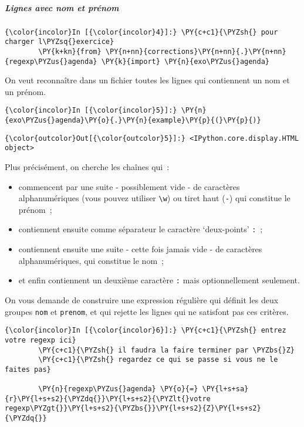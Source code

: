     \hypertarget{lignes-avec-nom-et-pruxe9nom}{%
\subparagraph{Lignes avec nom et
prénom}\label{lignes-avec-nom-et-pruxe9nom}}

    \begin{Verbatim}[commandchars=\\\{\}]
{\color{incolor}In [{\color{incolor}4}]:} \PY{c+c1}{\PYZsh{} pour charger l\PYZsq{}exercice}
        \PY{k+kn}{from} \PY{n+nn}{corrections}\PY{n+nn}{.}\PY{n+nn}{regexp\PYZus{}agenda} \PY{k}{import} \PY{n}{exo\PYZus{}agenda}
\end{Verbatim}


    On veut reconnaître dans un fichier toutes les lignes qui contiennent un
nom et un prénom.

    \begin{Verbatim}[commandchars=\\\{\}]
{\color{incolor}In [{\color{incolor}5}]:} \PY{n}{exo\PYZus{}agenda}\PY{o}{.}\PY{n}{example}\PY{p}{(}\PY{p}{)}
\end{Verbatim}


\begin{Verbatim}[commandchars=\\\{\}]
{\color{outcolor}Out[{\color{outcolor}5}]:} <IPython.core.display.HTML object>
\end{Verbatim}
            
    Plus précisément, on cherche les chaînes qui~:

\begin{itemize}
\tightlist
\item
  commencent par une suite - possiblement vide - de caractères
  alphanumériques (vous pouvez utiliser \texttt{\textbackslash{}w}) ou
  tiret haut (\texttt{-}) qui constitue le prénom~;
\item
  contiennent ensuite comme séparateur le caractère `deux-points'
  \texttt{:}~;
\item
  contiennent ensuite une suite - cette fois jamais vide - de caractères
  alphanumériques, qui constitue le nom~;
\item
  et enfin contiennent un deuxième caractère \texttt{:} mais
  optionnellement seulement.
\end{itemize}

    On vous demande de construire une expression régulière qui définit les
deux groupes \texttt{nom} et \texttt{prenom}, et qui rejette les lignes
qui ne satisfont pas ces critères.

    \begin{Verbatim}[commandchars=\\\{\}]
{\color{incolor}In [{\color{incolor}6}]:} \PY{c+c1}{\PYZsh{} entrez votre regexp ici}
        \PY{c+c1}{\PYZsh{} il faudra la faire terminer par \PYZbs{}Z}
        \PY{c+c1}{\PYZsh{} regardez ce qui se passe si vous ne le faites pas}
        
        \PY{n}{regexp\PYZus{}agenda} \PY{o}{=} \PY{l+s+sa}{r}\PY{l+s+s2}{\PYZdq{}}\PY{l+s+s2}{\PYZlt{}votre regexp\PYZgt{}}\PY{l+s+s2}{\PYZbs{}}\PY{l+s+s2}{Z}\PY{l+s+s2}{\PYZdq{}}
\end{Verbatim}



